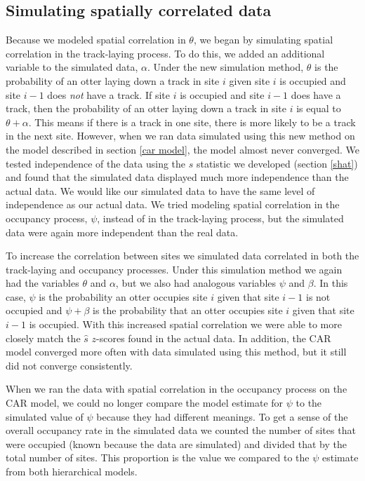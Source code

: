 \documentclass[12pt]{article}
\begin{document}
    \subsection{Simulating spatially correlated data}
    Because we modeled spatial correlation in $\theta$, we began by simulating
    spatial correlation in the track-laying process. To do this, we added an
    additional variable to the simulated data, $\alpha$. Under the new
    simulation method, $\theta$ is the probability of an otter laying down a
    track in site $i$ given site $i$ is occupied and site $i-1$ does
    \textit{not} have a track. If site $i$ is occupied and site $i-1$ does have
    a track, then the probability of an otter laying down a track in site $i$ is
    equal to $\theta+\alpha$. This means if there is a track in one site, there
    is more likely to be a track in the next site. However, when we ran data
    simulated using this new method on the model described in section \ref{car
    model}, the model almost never converged. We tested independence of the data
    using the $\hat{s}$ statistic we developed (section \ref{shat}) and found
    that the simulated data displayed much more independence than the actual
    data. We would like our simulated data to have the same level of independence 
	as our actual data.  We tried modeling spatial correlation in the occupancy 
	process, $\psi$, instead of in the track-laying process, but the simulated 
	data were again more independent than the real data.

    To increase the correlation between sites we simulated data
    correlated in both the track-laying and occupancy processes. Under this 
    simulation method we
    again had the variables $\theta$ and $\alpha$, but we also had analogous
    variables $ \psi$ and $\beta$. In this case, $\psi$ is the probability an
    otter occupies site $i$ given that site $i-1$ is not occupied and $\psi+
    \beta$ is the probability that an otter occupies site $i$ given that site
    $i-1$ is occupied. With this increased spatial correlation we were able to
    more closely match the $\hat{s}$ $z$-scores found in the actual data. In
    addition, the CAR model converged more often with data simulated using this
    method, but it still did not converge consistently.

    When we ran the data with spatial correlation in the occupancy process on
    the CAR model, we could no longer compare the model estimate for $\psi$ to
    the simulated value of $\psi$ because they had different meanings. To get a
    sense of the overall occupancy rate in the simulated data we counted the
    number of sites that were occupied (known because the data are simulated)
    and divided that by the total number of sites. This proportion is the value
    we compared to the $\psi$ estimate from both hierarchical models.
\end{document}
